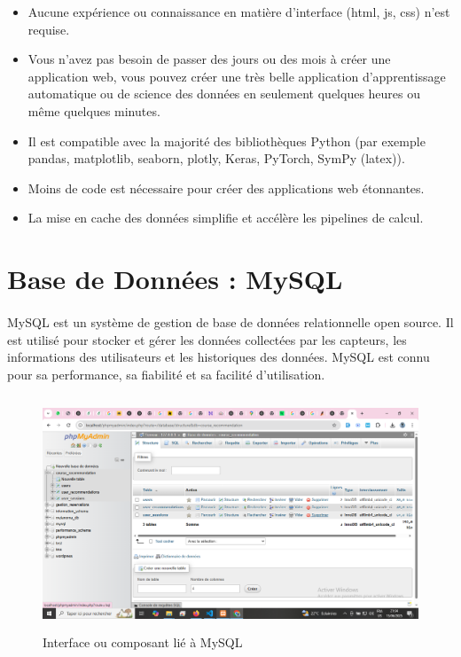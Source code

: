 \begin{itemize}
    \item Aucune expérience ou connaissance en matière d'interface (html, js, css) n'est requise.
    \item Vous n'avez pas besoin de passer des jours ou des mois à créer une application web, vous pouvez créer une très belle application d'apprentissage automatique ou de science des données en seulement quelques heures ou même quelques minutes.
    \item Il est compatible avec la majorité des bibliothèques Python (par exemple pandas, matplotlib, seaborn, plotly, Keras, PyTorch, SymPy (latex)).
    \item Moins de code est nécessaire pour créer des applications web étonnantes.
    \item La mise en cache des données simplifie et accélère les pipelines de calcul.
\end{itemize}

\section{Base de Données : MySQL}
\paragraph{}
MySQL est un système de gestion de base de données relationnelle open source. Il est utilisé pour stocker et gérer les données collectées par les capteurs, les informations des utilisateurs et les historiques des données. MySQL est connu pour sa performance, sa fiabilité et sa facilité d'utilisation.
\begin{figure}[h]
    \centering
    \includegraphics[width=\linewidth, height=7cm]{images/Capture d’écran (200).png}
    \caption{Interface ou composant lié à MySQL} 
\end{figure}

